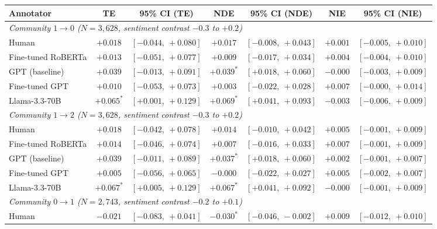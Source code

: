 \begin{table}[h]
\centering
\footnotesize
\begin{tabular}{lcccccc}
\toprule
Annotator & TE & 95\% CI (TE) & NDE & 95\% CI (NDE) & NIE & 95\% CI (NIE) \\
\midrule
\multicolumn{7}{l}{\textit{Community $1 \to 0$ ($N=3{,}628$, sentiment contrast $-0.3$ to $+0.2$)}} \\
\midrule
Human              & $+0.018$ & $[-0.044,\ +0.080]$ & $+0.017$ & $[-0.008,\ +0.043]$ & $+0.001$ & $[-0.005,\ +0.010]$ \\
Fine-tuned RoBERTa & $+0.013$ & $[-0.051,\ +0.077]$ & $+0.009$ & $[-0.017,\ +0.034]$ & $+0.004$ & $[-0.004,\ +0.010]$ \\
GPT (baseline)     & $+0.039$ & $[-0.013,\ +0.091]$ & $\mathbf{+0.039^*}$ & $\mathbf{[+0.018,\ +0.060]}$ & $-0.000$ & $[-0.003,\ +0.009]$ \\
Fine-tuned GPT     & $+0.010$ & $[-0.053,\ +0.073]$ & $+0.003$ & $[-0.022,\ +0.028]$ & $+0.007$ & $[-0.000,\ +0.014]$ \\
Llama-3.3-70B      & $\mathbf{+0.065^*}$ & $\mathbf{[+0.001,\ +0.129]}$ & $\mathbf{+0.069^*}$ & $\mathbf{[+0.041,\ +0.093]}$ & $-0.003$ & $[-0.006,\ +0.009]$ \\
\midrule
\multicolumn{7}{l}{\textit{Community $1 \to 2$ ($N=3{,}628$, sentiment contrast $-0.3$ to $+0.2$)}} \\
\midrule
Human              & $+0.018$ & $[-0.042,\ +0.078]$ & $+0.014$ & $[-0.010,\ +0.042]$ & $+0.005$ & $[-0.001,\ +0.009]$ \\
Fine-tuned RoBERTa & $+0.014$ & $[-0.046,\ +0.074]$ & $+0.007$ & $[-0.016,\ +0.033]$ & $+0.007$ & $[-0.001,\ +0.009]$ \\
GPT (baseline)     & $+0.039$ & $[-0.011,\ +0.089]$ & $\mathbf{+0.037^*}$ & $\mathbf{[+0.018,\ +0.060]}$ & $+0.002$ & $[-0.001,\ +0.007]$ \\
Fine-tuned GPT     & $+0.005$ & $[-0.056,\ +0.065]$ & $-0.000$ & $[-0.022,\ +0.027]$ & $+0.005$ & $[-0.002,\ +0.007]$ \\
Llama-3.3-70B      & $\mathbf{+0.067^*}$ & $\mathbf{[+0.005,\ +0.129]}$ & $\mathbf{+0.067^*}$ & $\mathbf{[+0.041,\ +0.092]}$ & $-0.000$ & $[-0.001,\ +0.009]$ \\
\midrule
\multicolumn{7}{l}{\textit{Community $0 \to 1$ ($N=2{,}743$, sentiment contrast $-0.2$ to $+0.1$)}} \\
\midrule
Human              & $-0.021$ & $[-0.083,\ +0.041]$ & $\mathbf{-0.030^*}$ & $\mathbf{[-0.046,\ -0.002]}$ & $+0.009$ & $[-0.012,\ +0.010]$ \\

\end{tabular}
\end{table}
